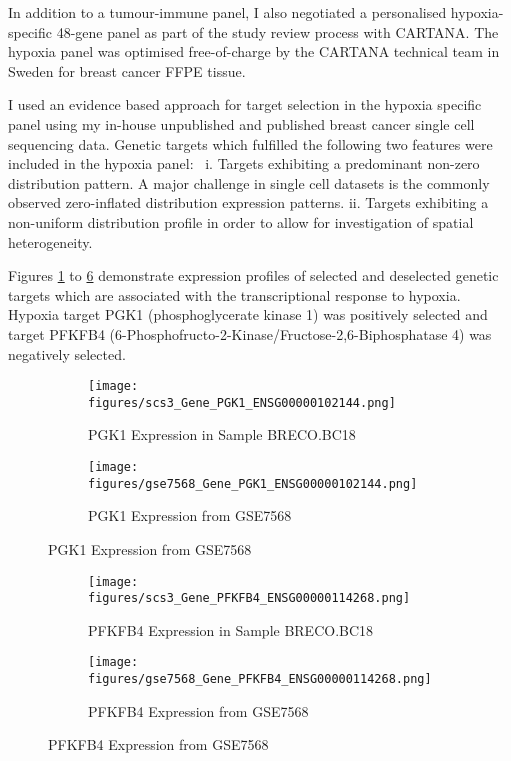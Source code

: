 In addition to a tumour-immune panel, I also negotiated a personalised hypoxia-specific 48-gene panel as part of the study review process with CARTANA. The hypoxia panel was optimised free-of-charge by the CARTANA technical team in Sweden for breast cancer FFPE tissue. 

I used an evidence based approach for target selection in the hypoxia specific panel using my in-house unpublished and published \cite{Chung2017} breast cancer single cell sequencing data. Genetic targets which fulfilled the following two features were included in the hypoxia panel: \
i. Targets exhibiting a predominant non-zero distribution pattern.
A major challenge in single cell datasets is the commonly observed zero-inflated distribution expression patterns.
ii. Targets exhibiting a non-uniform distribution profile in order to allow for investigation of spatial heterogeneity.

Figures \ref{fig:cartana_pgk1_breco} to \ref{fig:cartana_pfkfb4_gse7568} demonstrate expression profiles of selected and deselected genetic targets which are associated with the transcriptional response to hypoxia. Hypoxia target PGK1 (phosphoglycerate kinase 1) was positively selected and target PFKFB4 (6-Phosphofructo-2-Kinase/Fructose-2,6-Biphosphatase 4) was negatively selected.

\begin{figure}[ht]
	\begin{subfigure}
		\centering
		\texttt{[image: figures/scs3\_Gene\_PGK1\_ENSG00000102144.png]}  
		\caption{PGK1 Expression in Sample BRECO.BC18}
		\label{fig:cartana_pgk1_breco}
	\end{subfigure}
	\begin{subfigure}
		\centering
		\texttt{[image: figures/gse7568\_Gene\_PGK1\_ENSG00000102144.png]}  
		\caption{PGK1 Expression from GSE7568}
		\label{fig:cartana_pgk1_gse7568}
	\end{subfigure}
	\label{fig:cartana_pgk1}
\end{figure}	


\begin{figure}[ht]
		\begin{subfigure}
		\centering
		\texttt{[image: figures/scs3\_Gene\_PFKFB4\_ENSG00000114268.png]}  
		\caption{PFKFB4 Expression in Sample BRECO.BC18}
		\label{fig:cartana_pfkfb4_breco}
	\end{subfigure}
	\begin{subfigure}
		\centering
		\texttt{[image: figures/gse7568\_Gene\_PFKFB4\_ENSG00000114268.png]}  
		\caption{PFKFB4 Expression from GSE7568}
		\label{fig:cartana_pfkfb4_gse7568}
	\end{subfigure}
\end{figure}


